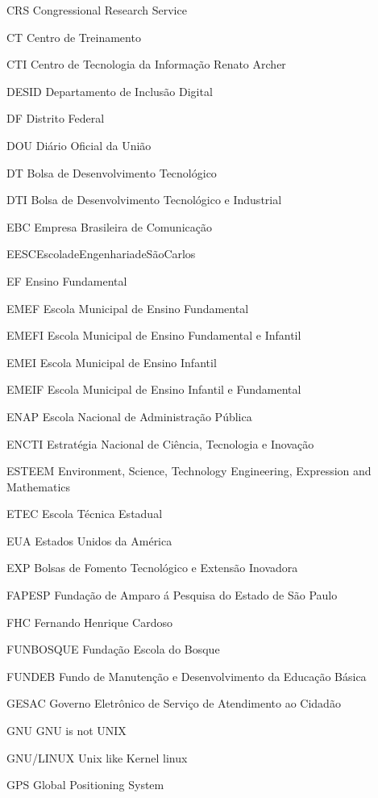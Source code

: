 \begin{siglas}
\item[CRS] Congressional Research Service
\item[CT] Centro de Treinamento
\item[CTI] Centro de Tecnologia da Informa\c{c}\~ao Renato Archer
\item[DESID] Departamento de Inclus\~ao Digital 
\item[DF] Distrito Federal
\item[DOU] Di\'ario Oficial da Uni\~ao
\item[DT] Bolsa de Desenvolvimento Tecnol\'ogico
\item[DTI]  Bolsa de Desenvolvimento Tecnol\'ogico e Industrial
\item[EBC] Empresa Brasileira de Comunica\c{c}\~ao
\item[EESCEscoladeEngenhariadeS\~aoCarlos]
\item[EF] Ensino Fundamental
\item[EMEF] Escola Municipal de Ensino Fundamental
\item[EMEFI]  Escola Municipal de Ensino Fundamental e Infantil
\item[EMEI] Escola Municipal de Ensino Infantil
\item[EMEIF] Escola Municipal de Ensino Infantil e Fundamental
\item[ENAP] Escola Nacional de Administra\c{c}\~ao P\'ublica
\item[ENCTI] Estrat\'egia Nacional de Ci\^encia, Tecnologia e Inova\c{c}\~ao
\item[ESTEEM] Environment, Science, Technology Engineering, Expression and Mathematics
\item[ETEC] Escola T\'ecnica Estadual
\item[EUA] Estados Unidos da Am\'erica
\item[EXP] Bolsas de Fomento Tecnol\'ogico e Extens\~ao Inovadora
\item[FAPESP] Funda\c{c}\~ao de Amparo \'a Pesquisa do Estado de S\~ao Paulo
\item[FHC]  Fernando Henrique Cardoso
\item[FUNBOSQUE] Funda\c{c}\~ao Escola do Bosque
\item[FUNDEB] Fundo de Manuten\c{c}\~ao e Desenvolvimento da Educa\c{c}\~ao B\'asica
\item[GESAC] Governo Eletr\^onico de Servi\c{c}o de Atendimento ao Cidad\~ao 
\item[GNU] GNU is not UNIX
\item[GNU/LINUX] Unix like Kernel linux
\item[GPS] Global Positioning System

\end{siglas}
